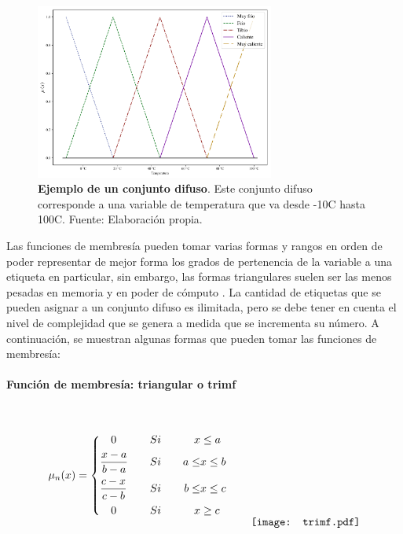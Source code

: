             \begin{figure}[htb]
                \centering
                \includegraphics[width=0.7\textwidth]{FuzzySet.pdf}
                \caption[Ejemplo de un conjunto difuso]{\textbf{Ejemplo de un conjunto difuso}. Este conjunto difuso corresponde a una variable de temperatura que va desde -10\textdegree C hasta 100\textdegree C. Fuente: Elaboración propia.} 
                \label{fig:FuzzySet}
            \end{figure}
            
            Las funciones de membresía pueden tomar varias formas y rangos en orden de poder representar de mejor forma los grados de pertenencia de la variable a una etiqueta en particular, sin embargo, las formas triangulares suelen ser las menos pesadas en memoria y en poder de cómputo \Parencite{riid2003transparent}. La cantidad de etiquetas que se pueden asignar a un conjunto difuso es ilimitada, pero se debe tener en cuenta el nivel de complejidad que se genera a medida que se incrementa su número. A continuación, se muestran algunas formas que pueden tomar las funciones de membresía:

            \paragraph{Función de membresía: triangular o trimf}$\quad$
            
            \begin{equation}\label{eq:trimf}
                \mu_n(x) = \left\{
                    \begin{aligned}
                        &\quad 0  &\quad &Si \quad & x &\leq a\\
                        &\frac{x - a}{b - a}  &\quad &Si \quad &  a \le &x \leq b \\
                        &\frac{c - x}{c - b}  &\quad &Si \quad & b \le &x \leq c \\
                        &\quad 0  &\quad &Si \quad&  x &\geq c
                    \end{aligned}\right.
                    \qquad
                    \raisebox{-15mm}{\texttt{[image: trimf.pdf]}}
            \end{equation}
            

